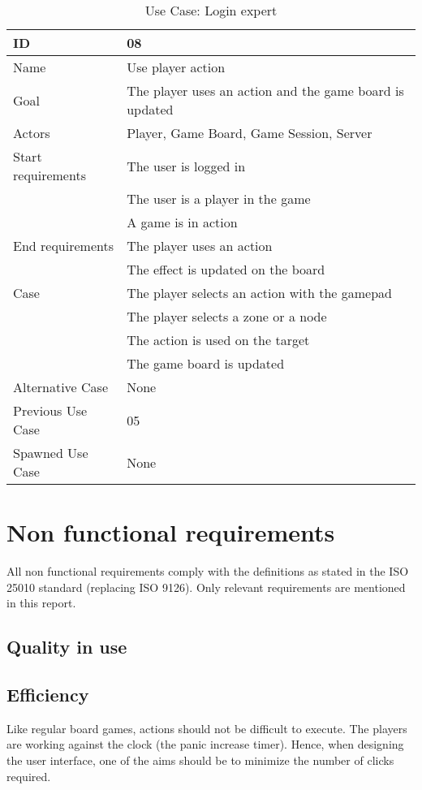 \begin{table}[H]
\begin{tabular}{|l|l|}
\hline
	\textbf{ID} & \textbf{08}\\ \hline
	Name & Use player action \\ \hline
	Goal & The player uses an action and the game board is updated\\ \hline
	Actors & Player, Game Board, Game Session, Server \\ \hline
	Start requirements & The user is logged in \\
				& The user is a player in the game\\
				& A game is in action\\ \hline
	End requirements & The player uses an action \\
				& The effect is updated on the board \\ \hline
	Case & The player selects an action with the gamepad\\
		& The player selects a zone or a node\\
		& The action is used on the target\\
		& The game board is updated\\ \hline
	Alternative Case & None\\ \hline
	Previous Use Case & 05\\ \hline
	Spawned Use Case & None\\ \hline
\end{tabular}
\caption{Use Case: Login expert}
\label{fig:usecase08table}
\end{table}



\section{Non functional requirements} 


All non functional requirements comply with the definitions as stated in the ISO 25010 standard (replacing ISO 9126). Only relevant requirements are mentioned in this report.

\subsection{Quality in use}

\subsection{Efficiency}
Like regular board games, actions should not be difficult to execute. The players are working against the clock (the panic increase timer). Hence, when designing the user interface, one of the aims should be to minimize the number of clicks required.

